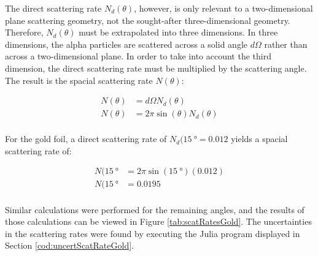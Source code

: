 \documentclass[a4paper]{article}
\begin{document}
\qq The direct scattering rate \( N_d (\theta) \), however, is only relevant to
a two-dimensional plane scattering geometry, not the sought-after
three-dimensional geometry. Therefore, \( N_d (\theta) \) must be extrapolated
into three dimensions. In three dimensions, the alpha particles are scattered
across a solid angle \( d\Omega \) rather than across a two-dimensional
plane. In order to take into account the third dimension, the direct scattering
rate must be multiplied by the scattering angle. The result is the spacial
scattering rate \( N (\theta) \):

\begin{align*}
  N (\theta) &= d\Omega N_d (\theta) \\
  N (\theta) &= 2 \pi \sin{(\theta)} N_d (\theta) \\
\end{align*} 

\qq For the gold foil, a direct scattering rate of \( N_d (\SI{15}{\degree} =
\num{0.012} \) yields a spacial scattering rate of:

\begin{align*}
  N (\SI{15}{\degree} &= 2 \pi \sin{(\SI{15}{\degree})} (\num{0.012}) \\
  N (\SI{15}{\degree} &= \num{0.0195} \\
\end{align*}

Similar calculations were performed for the remaining angles, and the results of
those calculations can be viewed in Figure \ref{tab:scatRatesGold}. The
uncertainties in the scattering rates were found by executing the Julia program
displayed in Section \ref{cod:uncertScatRateGold}.
\end{document}
